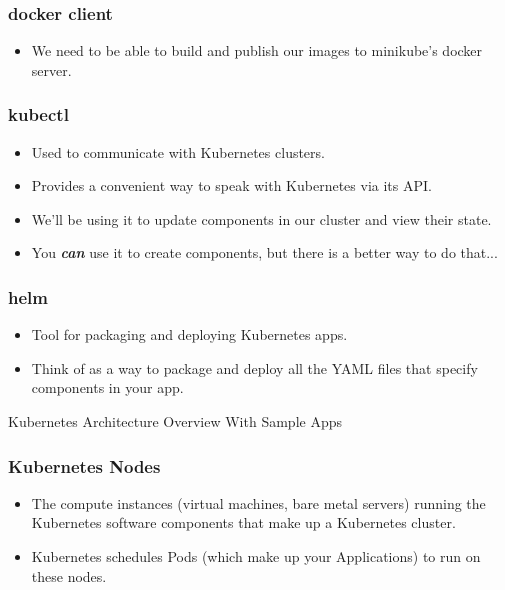 \documentclass{beamer}
\begin{document}
\begin{frame}
    \frametitle{docker client\footnotemark}
    \begin{itemize}
        \item We need to be able to build and publish our images to minikube's docker server.
    \end{itemize}
\end{frame}

\begin{frame}
\frametitle{kubectl\footnotemark}
\begin{itemize}
\item Used to communicate with Kubernetes clusters.
\item Provides a convenient way to speak with Kubernetes via its API.
\item We'll be using it to update components in our cluster and view their state.
\item You \textbf{\textit{can}} use it to create components, but there is a better way to do that...
\end{itemize}
\end{frame}

\begin{frame}
\frametitle{helm\footnotemark}
\begin{itemize}
    \item Tool for packaging and deploying Kubernetes apps.
    \item Think of as a way to package and deploy all the YAML files that specify components in your app.
\end{itemize}
\end{frame}

\begin{frame}
    \begin{center}
        \Huge Kubernetes Architecture Overview With Sample Apps
    \end{center}
\end{frame}

\begin{frame}
\frametitle{Kubernetes Nodes}
\begin{itemize}
\item The compute instances (virtual machines, bare metal servers) running the Kubernetes software components that make up a Kubernetes cluster.
\item Kubernetes schedules Pods (which make up your Applications) to run on these nodes.
\end{itemize}
\end{frame}
\end{document}
